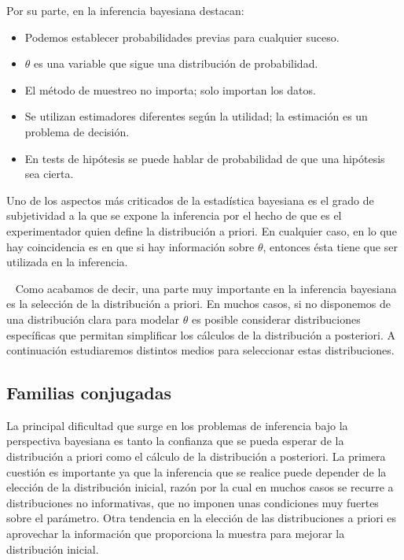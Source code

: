 Por su parte, en la inferencia bayesiana destacan:

\begin{itemize}
	\item Podemos establecer probabilidades previas para cualquier suceso.
	\item $\theta$ es una variable que sigue una distribución de probabilidad.
	\item El método de muestreo no importa; solo importan los datos.
	\item Se utilizan estimadores diferentes según la utilidad; la estimación es un problema de decisión.
    \item En tests de hipótesis se puede hablar de probabilidad de que una hipótesis sea cierta.
\end{itemize}

Uno de los aspectos más criticados de la estadística bayesiana es el grado de subjetividad a la que se expone la inferencia por el hecho de que es el experimentador quien define la distribución a priori. En cualquier caso, en lo que hay coincidencia es en que si hay información sobre $\theta$, entonces ésta tiene que ser utilizada en la inferencia.

\ \newline
Como acabamos de decir, una parte muy importante en la inferencia bayesiana es la selección de la distribución a priori. En muchos casos, si no disponemos de una distribución clara para modelar $\theta$ es posible considerar distribuciones específicas que permitan simplificar los cálculos de la distribución a posteriori. A continuación estudiaremos distintos medios para seleccionar estas distribuciones.

\subsection{Familias conjugadas}

La principal dificultad que surge en los problemas de inferencia bajo la perspectiva bayesiana es tanto la confianza que se pueda esperar de la distribución a priori como el cálculo de la distribución a posteriori. La primera cuestión es importante ya que la inferencia que se realice puede depender de la elección de la distribución inicial, razón por la cual en muchos casos se recurre a distribuciones no informativas, que no imponen unas condiciones muy fuertes sobre el parámetro. Otra tendencia en la elección de las distribuciones a priori es aprovechar la información que proporciona la muestra para mejorar la distribución inicial.%

